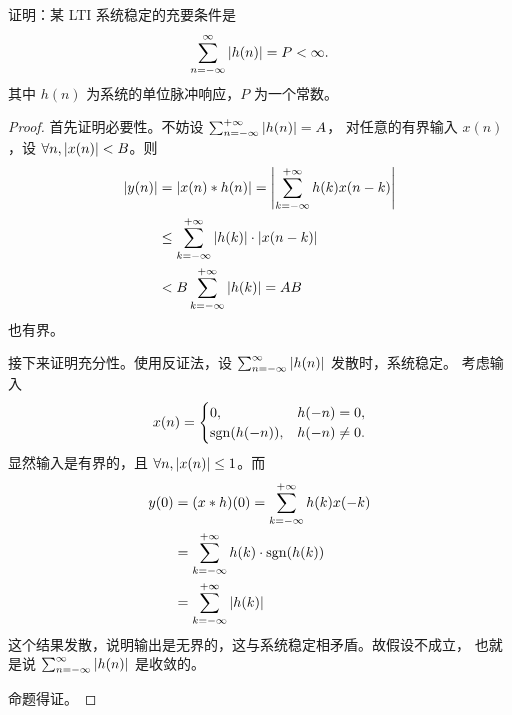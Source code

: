\begin{exercise}
    \label{exercise:LTI-stable}
    证明：某 LTI 系统稳定的充要条件是
    \begin{align*}
        \sum_{n = -\infty}^{\infty} \left|h(n)\right| = P < \infty.
    \end{align*}
    其中 $h(n)$ 为系统的单位脉冲响应，$P$ 为一个常数。
\end{exercise}

\begin{proof}
    首先证明必要性。不妨设 $\sum_{n= -\infty}^{+\infty}\left|h(n)\right| = A$，
    对任意的有界输入 $x(n)$，设 $\forall n, \left|x(n)\right| < B$。则
    \begin{align*}
        \left|y(n)\right| & = \left|x(n) * h(n)\right| = \left|\sum_{k = -\infty}^{+\infty}h(k)x(n - k)\right| \\
        & \le \sum_{k = -\infty}^{+\infty} \left|h(k)\right| \cdot \left|x(n - k)\right| \\
        & < B \sum_{k = -\infty}^{+\infty} \left|h(k)\right| = AB
    \end{align*}
    也有界。

    接下来证明充分性。使用反证法，设 $\sum_{n = -\infty}^{\infty} \left|h(n)\right|$ 发散时，系统稳定。
    考虑输入
    \begin{align*}
        x(n) = \begin{cases}
                0, & h(-n) = 0, \\
                \mathrm{sgn}(h(-n)), & h(-n) \neq 0.
            \end{cases}
    \end{align*}
    显然输入是有界的，且 $\forall n, \left|x(n)\right| \le 1$。而
    \begin{align*}
        y(0) & = (x * h)(0) = \sum_{k = -\infty}^{+\infty}h(k)x(-k) \\
        & = \sum_{k = -\infty}^{+\infty}h(k) \cdot \mathrm{sgn}(h(k)) \\
        & = \sum_{k = -\infty}^{+\infty}\left|h(k)\right|
    \end{align*}
    这个结果发散，说明输出是无界的，这与系统稳定相矛盾。故假设不成立，
    也就是说 $\sum_{n = -\infty}^{\infty} \left|h(n)\right|$ 是收敛的。

    命题得证。
\end{proof}

